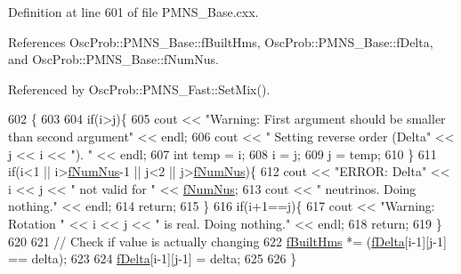 Definition at line 601 of file P\+M\+N\+S\+\_\+\+Base.\+cxx.



References Osc\+Prob\+::\+P\+M\+N\+S\+\_\+\+Base\+::f\+Built\+Hms, Osc\+Prob\+::\+P\+M\+N\+S\+\_\+\+Base\+::f\+Delta, and Osc\+Prob\+::\+P\+M\+N\+S\+\_\+\+Base\+::f\+Num\+Nus.



Referenced by Osc\+Prob\+::\+P\+M\+N\+S\+\_\+\+Fast\+::\+Set\+Mix().


\begin{DoxyCode}
602 \{
603 
604   \textcolor{keywordflow}{if}(i>j)\{
605     cout << \textcolor{stringliteral}{"Warning: First argument should be smaller than second argument"} << endl;
606     cout << \textcolor{stringliteral}{"         Setting reverse order (Delta"} << j << i << \textcolor{stringliteral}{"). "} << endl;
607     \textcolor{keywordtype}{int} temp = i;
608     i = j;
609     j = temp;
610   \}
611   \textcolor{keywordflow}{if}(i<1 || i>\hyperlink{classOscProb_1_1PMNS__Base_a24bb74bed63569dfe88b18fa6a08060e}{fNumNus}-1 || j<2 || j>\hyperlink{classOscProb_1_1PMNS__Base_a24bb74bed63569dfe88b18fa6a08060e}{fNumNus})\{
612     cout << \textcolor{stringliteral}{"ERROR: Delta"} << i << j << \textcolor{stringliteral}{" not valid for "} << \hyperlink{classOscProb_1_1PMNS__Base_a24bb74bed63569dfe88b18fa6a08060e}{fNumNus};
613     cout << \textcolor{stringliteral}{" neutrinos. Doing nothing."} << endl;
614     \textcolor{keywordflow}{return};
615   \}
616   \textcolor{keywordflow}{if}(i+1==j)\{
617     cout << \textcolor{stringliteral}{"Warning: Rotation "} << i << j << \textcolor{stringliteral}{" is real. Doing nothing."} << endl;
618     \textcolor{keywordflow}{return};
619   \}
620 
621   \textcolor{comment}{// Check if value is actually changing}
622   \hyperlink{classOscProb_1_1PMNS__Base_a9ac3cadeac8db1b90f3152f476244780}{fBuiltHms} *= (\hyperlink{classOscProb_1_1PMNS__Base_ab2a5fa40e689b221c8a7d2c17213810d}{fDelta}[i-1][j-1] == delta);
623 
624   \hyperlink{classOscProb_1_1PMNS__Base_ab2a5fa40e689b221c8a7d2c17213810d}{fDelta}[i-1][j-1] = delta;
625 
626 \}
\end{DoxyCode}
\mbox{\label{classOscProb_1_1PMNS__Fast_a63733b246e6d2e609ce3de7a65ba5b9f}} 
